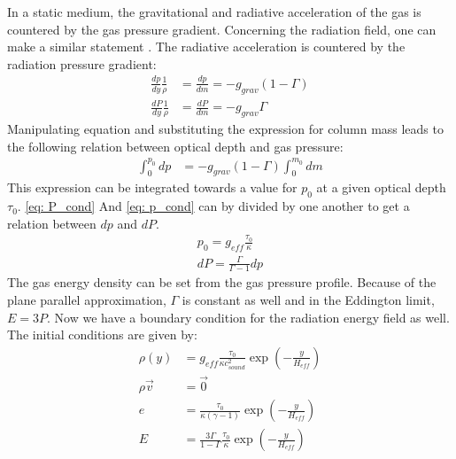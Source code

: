 In a static medium, the gravitational and radiative acceleration of the gas is countered by the gas pressure gradient. Concerning the radiation field, one can make a similar statement . The radiative acceleration is countered by the radiation pressure gradient:
\begin{align}
\frac{dp}{dy} \frac{1}{\rho} &= \frac{dp}{dm} = -g_{grav}(1 - \Gamma) \label{eq: p_cond} \\
\frac{dP}{dy} \frac{1}{\rho} &= \frac{dP}{dm} = -g_{grav} \Gamma \label{eq: P_cond}
\end{align}
Manipulating equation \label{eq: p_cond} and substituting the expression for column mass leads to the following relation between optical depth and gas pressure:
\begin{align}
\int_0^{p_0} dp &= -g_{grav}(1 - \Gamma) \int_0^{m_0} dm
\end{align}
This expression can be integrated towards a value for $p_0$ at a given optical depth $\tau_0$. \eqref{eq: P_cond} And \eqref{eq: p_cond} can by divided by one another to get a relation between $dp$ and $dP$.
\begin{align}
p_0 = g_{eff} \frac{\tau_0}{\kappa} \\
dP = \frac{\Gamma}{\Gamma-1} dp
\end{align}
The gas energy density can be set from the gas pressure profile. Because of the plane parallel approximation, $\Gamma$ is constant as well and in the Eddington limit, $E=3P$. Now we have a boundary condition for the radiation energy field as well. The initial conditions are given by:
\begin{align}
\rho(y) &= g_{eff} \frac{\tau_0}{\kappa c_{sound}^2} \exp \left( -\frac{y}{H_{eff}} \right) \\
\rho \vec{v} &= \vec{0} \\
e &= \frac{\tau_0}{\kappa (\gamma - 1)} \exp \left( -\frac{y}{H_{eff}} \right) \\
E &= \frac{3 \Gamma}{1-\Gamma} \frac{\tau_0}{\kappa} \exp \left( -\frac{y}{H_{eff}} \right) \\
\end{align}

